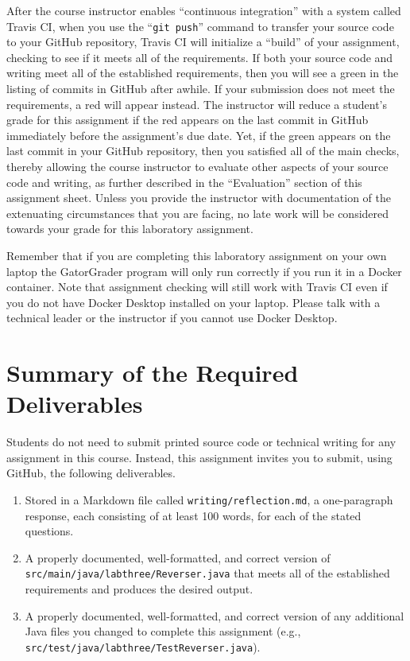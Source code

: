 \documentclass[11pt]{article}
\newcommand{\mainprogramsource}{\lstinline{src/main/java/labthree/Reverser.java}}
\newcommand{\testprogramsource}{\lstinline{src/test/java/labthree/TestReverser.java}}
\newcommand{\reflection}{\lstinline{writing/reflection.md}}
\newcommand{\gitpush}{\command{git push}}
\newcommand{\command}[1]{``\lstinline{#1}''}
\newcommand{\step}[1]{``{#1}''}
\newcommand{\checkmark}{\ding{51}}
\newcommand{\naughtmark}{\ding{55}}
\begin{document}
After the course instructor enables \step{continuous integration} with a system
called Travis CI, when you use the \gitpush{} command to transfer your source
code to your GitHub repository, Travis CI will initialize a \step{build} of your
assignment, checking to see if it meets all of the requirements. If both your
source code and writing meet all of the established requirements, then you will
see a green \checkmark{} in the listing of commits in GitHub after awhile. If
your submission does not meet the requirements, a red \naughtmark{} will appear
instead. The instructor will reduce a student's grade for this assignment if the
red \naughtmark{} appears on the last commit in GitHub immediately before the
assignment's due date. Yet, if the green \checkmark{} appears on the last commit
in your GitHub repository, then you satisfied all of the main checks, thereby
allowing the course instructor to evaluate other aspects of your source code and
writing, as further described in the \step{Evaluation} section of this
assignment sheet. Unless you provide the instructor with documentation of the
extenuating circumstances that you are facing, no late work will be considered
towards your grade for this laboratory assignment.

Remember that if you are completing this laboratory assignment on your own
laptop the GatorGrader program will only run correctly if you run it in a Docker
container.
%
Note that assignment checking will still work with Travis CI even if you do not
have Docker Desktop installed on your laptop.
%
Please talk with a technical leader or the instructor if you cannot use Docker
Desktop.

\section*{Summary of the Required Deliverables}

\noindent Students do not need to submit printed source code or technical
writing for any assignment in this course. Instead, this assignment invites you
to submit, using GitHub, the following deliverables.

\vspace*{-.075in}
\begin{enumerate}

  \setlength{\itemsep}{0in}

\item Stored in a Markdown file called \reflection{}, a one-paragraph response,
  each consisting of at least 100 words, for each of the stated questions.

\item A properly documented, well-formatted, and correct version of
  \mainprogramsource{} that meets all of the established requirements and
  produces the desired output.

\item A properly documented, well-formatted, and correct version of any
  additional Java files you changed to complete this assignment (e.g.,
  \testprogramsource{}).

\end{enumerate}
\vspace*{-.1in}
\end{document}
